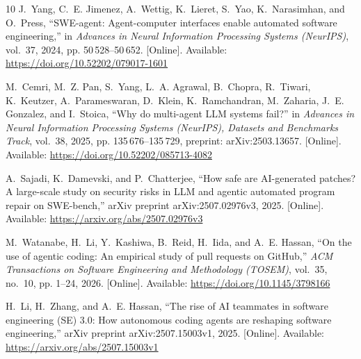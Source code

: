 \documentclass[conference]{IEEEtran}
\begin{document}
\begin{thebibliography}{10}
\BIBentryALTinterwordspacing
J.~Yang, C.~E. Jimenez, A.~Wettig, K.~Lieret, S.~Yao, K.~Narasimhan, and
  O.~Press, ``{SWE-agent}: Agent-computer interfaces enable automated software
  engineering,'' in \emph{Advances in Neural Information Processing Systems
  (NeurIPS)}, vol.~37, 2024, pp. 50\,528--50\,652. [Online]. Available:
  \url{https://doi.org/10.52202/079017-1601}
\BIBentrySTDinterwordspacing

\BIBentryALTinterwordspacing
M.~Cemri, M.~Z. Pan, S.~Yang, L.~A. Agrawal, B.~Chopra, R.~Tiwari, K.~Keutzer,
  A.~Parameswaran, D.~Klein, K.~Ramchandran, M.~Zaharia, J.~E. Gonzalez, and
  I.~Stoica, ``Why do multi-agent {LLM} systems fail?'' in \emph{Advances in
  Neural Information Processing Systems (NeurIPS), Datasets and Benchmarks
  Track}, vol.~38, 2025, pp. 135\,676--135\,729, preprint: arXiv:2503.13657.
  [Online]. Available: \url{https://doi.org/10.52202/085713-4082}
\BIBentrySTDinterwordspacing

\BIBentryALTinterwordspacing
A.~Sajadi, K.~Damevski, and P.~Chatterjee, ``How safe are {AI}-generated
  patches? {A} large-scale study on security risks in {LLM} and agentic
  automated program repair on {SWE-bench},'' arXiv preprint arXiv:2507.02976v3,
  2025. [Online]. Available: \url{https://arxiv.org/abs/2507.02976v3}
\BIBentrySTDinterwordspacing

\BIBentryALTinterwordspacing
M.~Watanabe, H.~Li, Y.~Kashiwa, B.~Reid, H.~Iida, and A.~E. Hassan, ``On the
  use of agentic coding: An empirical study of pull requests on {GitHub},''
  \emph{ACM Transactions on Software Engineering and Methodology (TOSEM)},
  vol.~35, no.~10, pp. 1--24, 2026. [Online]. Available:
  \url{https://doi.org/10.1145/3798166}
\BIBentrySTDinterwordspacing

\BIBentryALTinterwordspacing
H.~Li, H.~Zhang, and A.~E. Hassan, ``The rise of {AI} teammates in software
  engineering ({SE}) 3.0: How autonomous coding agents are reshaping software
  engineering,'' arXiv preprint arXiv:2507.15003v1, 2025. [Online]. Available:
  \url{https://arxiv.org/abs/2507.15003v1}
\BIBentrySTDinterwordspacing

\end{thebibliography}
\end{document}
